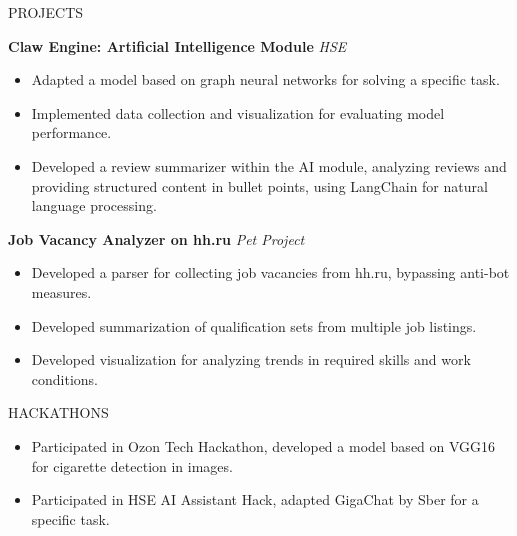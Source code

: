\documentclass{resume}
\begin{document}
\begin{rSection}{PROJECTS}

\textbf{Claw Engine: Artificial Intelligence Module}  
\textit{HSE}  
\begin{itemize}
    \itemsep -3pt {} 
    \item Adapted a model based on graph neural networks for solving a specific task.
    \item Implemented data collection and visualization for evaluating model performance.
    \item Developed a review summarizer within the AI module, analyzing reviews and providing structured content in bullet points, using LangChain for natural language processing.
\end{itemize}

\textbf{Job Vacancy Analyzer on hh.ru}  
\textit{Pet Project}  
\begin{itemize}
    \itemsep -3pt {} 
    \item Developed a parser for collecting job vacancies from hh.ru, bypassing anti-bot measures.
    \item Developed summarization of qualification sets from multiple job listings.
    \item Developed visualization for analyzing trends in required skills and work conditions.
\end{itemize}

\end{rSection}

\begin{rSection}{HACKATHONS}
\begin{itemize}
    \itemsep -3pt {} 
    \item Participated in Ozon Tech Hackathon, developed a model based on VGG16 for cigarette detection in images.
    \item Participated in HSE AI Assistant Hack, adapted GigaChat by Sber for a specific task.
\end{itemize}
\end{rSection}
\end{document}
